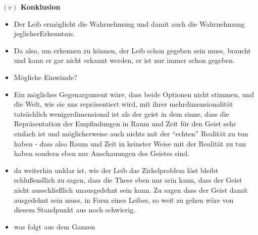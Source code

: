 \documentclass[a4paper, 12pt]{article}
\begin{document}
\begin{onehalfspace}
\vspace{5mm}
\noindent\textbf{$(v)$ Konklusion}

\begin{itemize}
  \item Der Leib ermöglicht die Wahrnehmung und damit auch die Wahrnehmung jeglicherErkenntnis.
  \item Da also, um erkennen zu können, der Leib schon gegeben sein muss, braucht und kann er gar nicht erkannt werden, er ist nur immer schon gegeben.
  \item Mögliche Einwände?
  \item Ein mögliches Gegenargument wäre, dass beide Optionen nicht stimmen, und die Welt, wie sie uns repräsentiert wird, mit ihrer mehrdimensionalität tatsächlich wenigerdimensional ist als der geist in dem sinne, dass die Repräsentation der Empfindungen in Raum und Zeit für den Geist sehr einfach ist und möglicherweise auch nichts mit der "`echten"' Realität zu tun haben - dass also Raum und Zeit in keinster Weise mit der Realität zu tun haben sondern eben nur Anschauungen des Geistes sind.
  \item da weiterhin unklar ist, wie der Leib das Zirkelproblem löst bleibt schlußendlich zu sagen, dass die These eben nur sein kann, dass der Geist nicht ausschließlich unausgedehnt sein kann. Zu sagen dass der Geist damit ausgedehnt sein muss, in Form eines Leibes, so weit zu gehen wäre von diesem Standpunkt aus noch schwierig.
  \item was folgt aus dem Ganzen
\end{itemize}



\end{onehalfspace}
\end{document}
